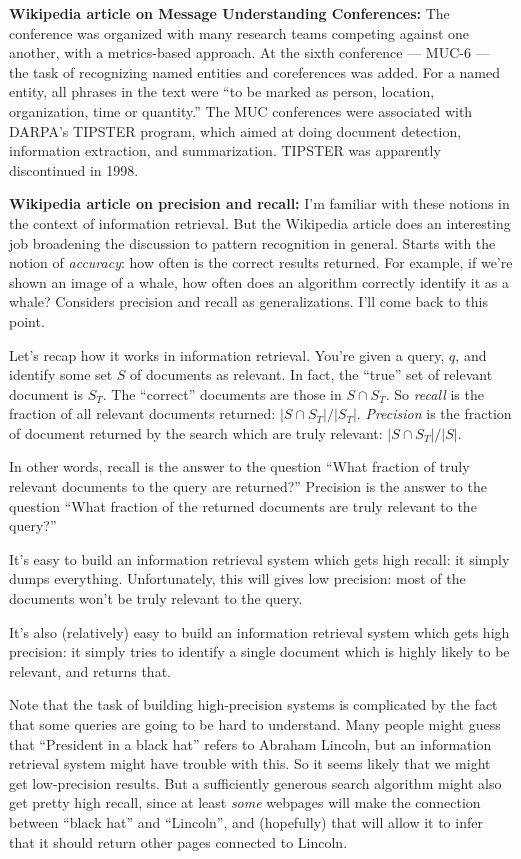 \textbf{Wikipedia article on Message Understanding Conferences:} The
conference was organized with many research teams competing against
one another, with a metrics-based approach.  At the sixth conference
--- MUC-6 --- the task of recognizing named entities and coreferences
was added.  For a named entity, all phrases in the text were ``to be
marked as person, location, organization, time or quantity.''  The MUC
conferences were associated with DARPA's TIPSTER program, which aimed
at doing document detection, information extraction, and
summarization.  TIPSTER was apparently discontinued in 1998.

\textbf{Wikipedia article on precision and recall:} I'm familiar with
these notions in the context of information retrieval.  But the
Wikipedia article does an interesting job broadening the discussion to
pattern recognition in general.  Starts with the notion of
\emph{accuracy}: how often is the correct results returned.  For
example, if we're shown an image of a whale, how often does an
algorithm correctly identify it as a whale?  Considers precision and
recall as generalizations.  I'll come back to this point.

Let's recap how it works in information retrieval.  You're given a
query, $q$, and identify some set $S$ of documents as relevant.  In
fact, the ``true'' set of relevant document is $S_T$.  The ``correct''
documents are those in $S \cap S_T$.  So \emph{recall} is the fraction
of all relevant documents returned: $|S \cap S_T| / |S_T|$.
\emph{Precision} is the fraction of document returned by the search
which are truly relevant: $|S \cap S_T| / |S|$.

In other words, recall is the answer to the question ``What fraction
of truly relevant documents to the query are returned?''  Precision is
the answer to the question ``What fraction of the returned documents
are truly relevant to the query?''

It's easy to build an information retrieval system which gets high
recall: it simply dumps everything.  Unfortunately, this will gives
low precision: most of the documents won't be truly relevant to the
query.

It's also (relatively) easy to build an information retrieval system
which gets high precision: it simply tries to identify a single
document which is highly likely to be relevant, and returns that.  

Note that the task of building high-precision systems is complicated
by the fact that some queries are going to be hard to understand.
Many people might guess that ``President in a black hat'' refers to
Abraham Lincoln, but an information retrieval system might have
trouble with this.  So it seems likely that we might get low-precision
results.  But a sufficiently generous search algorithm might also get
pretty high recall, since at least \emph{some} webpages will make the
connection between ``black hat'' and ``Lincoln'', and (hopefully) that
will allow it to infer that it should return other pages connected to
Lincoln.

